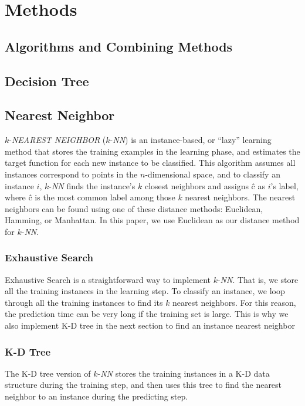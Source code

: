 \section{Methods}
	\subsection{Algorithms and Combining Methods}
		
	\subsection{Decision Tree}
	\subsection{Nearest Neighbor}
		$k$-\textit{NEAREST NEIGHBOR} ($k$-\textit{NN}) is an instance-based, or ``lazy'' learning method that stores the training examples in the learning phase, and estimates the target function for each new instance to be classified. This algorithm assumes all instances correspond to points in the $n$-dimensional space, and to classify an instance $i$, $k$-\textit{NN} finds the instance's $k$ closest neighbors and assigns \^{c} as $i$'s label, where \^{c} is the most common label among those $k$ nearest neighbors. The nearest neighbors can be found using one of these distance methods: Euclidean, Hamming, or Manhattan. In this paper, we use Euclidean as our distance method for $k$-\textit{NN}.
		\subsubsection{Exhaustive Search}
		Exhaustive Search is a straightforward way to implement $k$-\textit{NN}. That is, we store all the training instances in the learning step. To classify an instance, we loop through all the training instances to find its $k$ nearest neighbors. For this reason, the prediction time can be very long if the training set is large. This is why we also implement K-D tree in the next section to find an instance nearest neighbor
		
		\subsubsection{K-D Tree}
		The K-D tree version of $k$-\textit{NN} stores the training instances in a K-D data structure during the training step, and then uses this tree to find the nearest neighbor to an instance during the predicting step.
		

